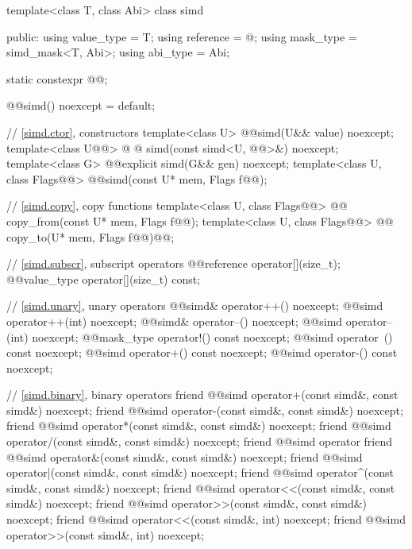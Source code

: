 \begin{codeblock}
template<class T, class Abi> class simd {
public:
  using value_type = T;
  using reference = @\seebelow@;
  using mask_type = simd_mask<T, Abi>;
  using abi_type = Abi;

  static constexpr @@;

  @@simd() noexcept = default;

  // \ref{simd.ctor},  constructors
  template<class U> @@simd(U&& value) noexcept;
  template<class U@@> @
    @ simd(const simd<U, @@>&) noexcept;
  template<class G> @@explicit simd(G&& gen) noexcept;
  template<class U, class Flags@@> @@simd(const U* mem, Flags f@\wgAdd{ = \{\}}@);

  // \ref{simd.copy},  copy functions
  template<class U, class Flags@@>
    @@ copy_from(const U* mem, Flags f@\wgAdd{ = \{\}}@);
  template<class U, class Flags@@>
    @@ copy_to(U* mem, Flags f@\wgAdd{ = \{\}}@)@@;

  // \ref{simd.subscr},  subscript operators
  @@reference operator[](size_t);
  @@value_type operator[](size_t) const;

  // \ref{simd.unary},  unary operators
  @@simd& operator++() noexcept;
  @@simd operator++(int) noexcept;
  @@simd& operator--() noexcept;
  @@simd operator--(int) noexcept;
  @@mask_type operator!() const noexcept;
  @@simd operator~() const noexcept;
  @@simd operator+() const noexcept;
  @@simd operator-() const noexcept;

  // \ref{simd.binary},  binary operators
  friend @@simd operator+(const simd&, const simd&) noexcept;
  friend @@simd operator-(const simd&, const simd&) noexcept;
  friend @@simd operator*(const simd&, const simd&) noexcept;
  friend @@simd operator/(const simd&, const simd&) noexcept;
  friend @@simd operator%
  friend @@simd operator&(const simd&, const simd&) noexcept;
  friend @@simd operator|(const simd&, const simd&) noexcept;
  friend @@simd operator^(const simd&, const simd&) noexcept;
  friend @@simd operator<<(const simd&, const simd&) noexcept;
  friend @@simd operator>>(const simd&, const simd&) noexcept;
  friend @@simd operator<<(const simd&, int) noexcept;
  friend @@simd operator>>(const simd&, int) noexcept;

}
\end{codeblock}

